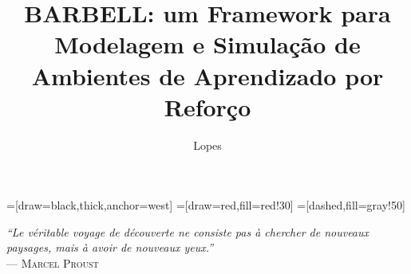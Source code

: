 \documentclass[cic,tc]{iiufrgs}
\title{BARBELL: um Framework para Modelagem e Simulação de Ambientes de Aprendizado por Reforço}
\author{Lopes}{Henrique de Paula}
\newcommand\bruno[1]{\textcolor{magenta}{#1}}
\begin{document}
=[draw=black,thick,anchor=west]
=[draw=red,fill=red!30]
=[dashed,fill=gray!50]
\maketitle

\clearpage
\begin{flushright}
    \mbox{}\vfill
    {\sffamily\itshape
      ``Le véritable voyage de découverte ne consiste pas à chercher de nouveaux paysages,
      mais à avoir de nouveaux yeux.''\\}
    --- \textsc{Marcel Proust}
\end{flushright}


\end{document}

